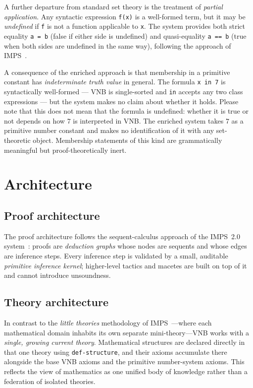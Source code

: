 \documentclass{amsbook}[openany]
\theoremstyle{definition}
\theoremstyle{remark}
\theoremstyle{remark}
\begin{document}
A further departure from standard set theory is the treatment of
\emph{partial application}.  Any syntactic expression \texttt{f(x)}
is a well-formed term, but it may be \emph{undefined} if \texttt{f} is
not a function applicable to \texttt{x}.  The system provides both
strict equality \texttt{a = b} (false if either side is undefined) and
quasi-equality \texttt{a == b} (true when both sides are undefined in
the same way), following the approach of IMPS~\cite{IMPS}.

A consequence of the enriched approach is that membership in a
primitive constant has \emph{indeterminate truth value} in general.
The formula \texttt{x in 7} is syntactically well-formed --- VNB is
single-sorted and \texttt{in} accepts any two class expressions ---
but the system makes no claim about whether it holds. Please note that
this does not mean that the formula is undefined: whether it is true
or not depends on how $7$ is interpreted in VNB. The enriched system
takes $7$ as a primitive number constant and makes no identification
of it with any set-theoretic object.  Membership statements of this
kind are grammatically meaningful but proof-theoretically inert.

\section{Architecture}
\label{sec:architecture}

\subsection{Proof architecture}

The proof architecture follows the sequent-calculus approach of the
IMPS~2.0 system~\cite{IMPS}: proofs are \emph{deduction graphs} whose
nodes are sequents and whose edges are inference steps.  Every inference
step is validated by a small, auditable \emph{primitive inference kernel};
higher-level tactics and macetes are built on top of it and cannot
introduce unsoundness.

\subsection{Theory architecture}

In contrast to the \emph{little theories} methodology of
IMPS~\cite{IMPS}---where each mathematical domain inhabits its own
separate mini-theory---VNB works with a \emph{single, growing current
theory}.  Mathematical structures are declared directly in that one theory
using \texttt{def-structure}, and their axioms accumulate there alongside
the base VNB axioms and the primitive number-system axioms.  This reflects
the view of mathematics as one unified body of knowledge rather than a
federation of isolated theories.
\end{document}
